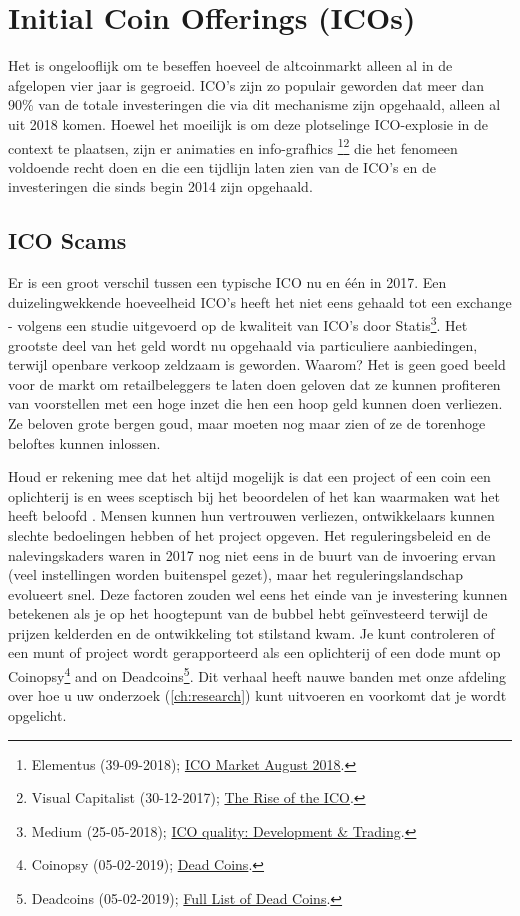 \section{Initial Coin Offerings (ICOs)}
Het is ongelooflijk om te beseffen hoeveel de altcoinmarkt alleen al in de afgelopen vier jaar is gegroeid. ICO's zijn zo populair geworden dat meer dan 90\% van de totale investeringen die via dit mechanisme zijn opgehaald, alleen al uit 2018 komen. Hoewel het moeilijk is om deze plotselinge ICO-explosie in de context te plaatsen, zijn er animaties en info-grafhics \footnote{Elementus (39-09-2018); \href{https://elementus.io/blog/ico-market-august-2018}{ICO Market August 2018}.}\footnote{Visual Capitalist (30-12-2017); \href{https://www.visualcapitalist.com/the-rise-of-the-ico}{The Rise of the ICO}.} die het fenomeen voldoende recht doen en die een tijdlijn laten zien van de ICO's en de investeringen die sinds begin 2014 zijn opgehaald. 

\subsection{ICO Scams}

Er is een groot verschil tussen een typische ICO nu en \'e\'en in 2017. Een duizelingwekkende hoeveelheid ICO's heeft het niet eens gehaald tot een exchange - volgens een studie uitgevoerd op de kwaliteit van ICO's door  Statis\footnote{Medium (25-05-2018); \href{https://medium.com/satis-group/ico-quality-development-trading-e4fef28df04f}{ICO quality: Development \& Trading}.}. Het grootste deel van het geld wordt nu opgehaald via particuliere aanbiedingen, terwijl openbare verkoop zeldzaam is geworden. Waarom? Het is geen goed beeld voor de markt om retailbeleggers te laten doen geloven dat ze kunnen profiteren van voorstellen met een hoge inzet die hen een hoop geld kunnen doen verliezen. Ze beloven grote bergen goud, maar moeten nog maar zien of ze de torenhoge beloftes kunnen inlossen.

Houd er rekening mee dat het altijd mogelijk is dat een project of een coin een oplichterij is en wees sceptisch bij het beoordelen of het kan waarmaken wat het heeft beloofd . Mensen kunnen hun vertrouwen verliezen, ontwikkelaars kunnen slechte bedoelingen hebben of het project opgeven. Het reguleringsbeleid en de nalevingskaders waren in 2017 nog niet eens in de buurt van de invoering ervan (veel instellingen worden buitenspel gezet), maar het reguleringslandschap evolueert snel. Deze factoren zouden wel eens het einde van je investering kunnen betekenen als je op het hoogtepunt van de bubbel hebt ge\"investeerd terwijl de prijzen kelderden en de ontwikkeling tot stilstand kwam. Je kunt controleren of een munt of project wordt gerapporteerd als een oplichterij of een dode munt op Coinopsy\footnote{Coinopsy (05-02-2019);
\href{https://www.coinopsy.com/dead-coins}{Dead Coins}.} and on Deadcoins\footnote{Deadcoins (05-02-2019); \href{https://deadcoins.com}{Full List of Dead Coins}.}. Dit verhaal heeft nauwe banden met onze afdeling over hoe u uw onderzoek (\cref{ch:research}) kunt uitvoeren en voorkomt dat je wordt opgelicht. 

